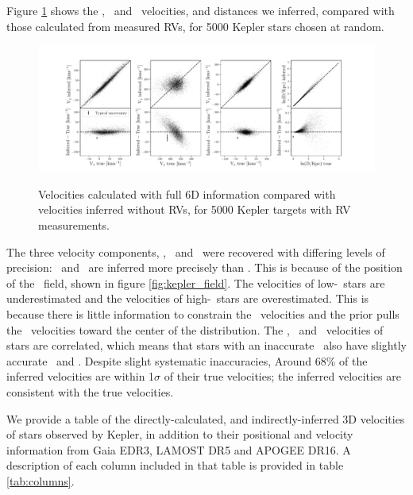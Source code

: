 Figure \ref{fig:residuals} shows the \vx, \vy\ and \vz\ velocities, and
distances we inferred, compared with those calculated from measured RVs, for
5000 Kepler stars chosen at random.
\begin{figure}[ht!]
\caption{Velocities calculated with full 6D information compared with
    velocities inferred without RVs, for 5000 Kepler targets with RV
    measurements.}
  \centering
    \includegraphics[width=1\textwidth]{residuals}
\label{fig:residuals}
\end{figure}
The three velocity components, \vx, \vy\ and \vz\ were recovered with
differing levels of precision: \vx\ and \vz\ are inferred more precisely than
\vy.
This is because of the position of the \kepler\ field, shown in figure
\ref{fig:kepler_field}.
The velocities of low-\vy\ stars are underestimated and the velocities of
high-\vy\ stars are overestimated.
This is because there is little information to constrain the \vy\ velocities
and the prior pulls the \vy\ velocities toward the center of the distribution.
The \vx, \vy\ and \vz\ velocities of stars are correlated, which means that
stars with an inaccurate \vy\ also have slightly accurate \vz\ and \vx.
Despite slight systematic inaccuracies, Around 68\% of the inferred velocities
are within 1$\sigma$ of their true velocities; the inferred velocities are
consistent with the true velocities.

We provide a table of the directly-calculated, and indirectly-inferred 3D
velocities of stars observed by Kepler, in addition to their positional and
velocity information from Gaia EDR3, LAMOST DR5 and APOGEE DR16.
A description of each column included in that table is provided in table
\ref{tab:columns}.

